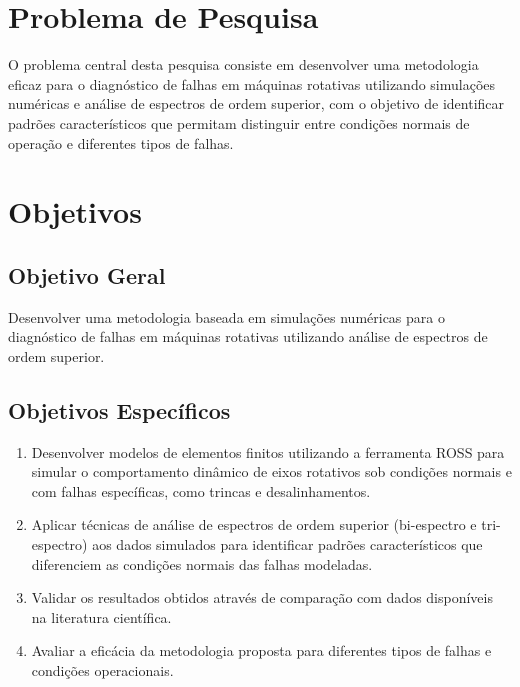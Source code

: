 \section{Problema de Pesquisa}

O problema central desta pesquisa consiste em desenvolver uma metodologia eficaz para o diagnóstico de falhas em máquinas rotativas utilizando simulações numéricas e análise de espectros de ordem superior, com o objetivo de identificar padrões característicos que permitam distinguir entre condições normais de operação e diferentes tipos de falhas.

\section{Objetivos}

\subsection{Objetivo Geral}

Desenvolver uma metodologia baseada em simulações numéricas para o diagnóstico de falhas em máquinas rotativas utilizando análise de espectros de ordem superior.

\subsection{Objetivos Específicos}

\begin{enumerate}
    \item Desenvolver modelos de elementos finitos utilizando a ferramenta ROSS para simular o comportamento dinâmico de eixos rotativos sob condições normais e com falhas específicas, como trincas e desalinhamentos.
    
    \item Aplicar técnicas de análise de espectros de ordem superior (bi-espectro e tri-espectro) aos dados simulados para identificar padrões característicos que diferenciem as condições normais das falhas modeladas.
    
    \item Validar os resultados obtidos através de comparação com dados disponíveis na literatura científica.
    
    \item Avaliar a eficácia da metodologia proposta para diferentes tipos de falhas e condições operacionais.
\end{enumerate}

